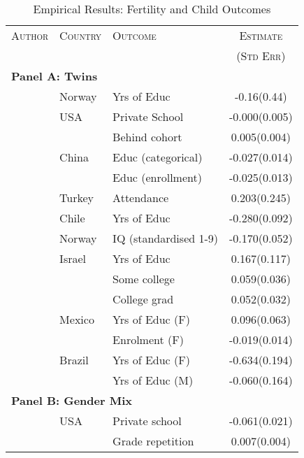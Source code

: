 \begin{table}
\caption{Empirical Results: Fertility and Child Outcomes}
\label{Ftab:childQQ}
\begin{tabular}{lllc} \toprule
\textsc{Author} & \textsc{Country} & \textsc{Outcome} & \textsc{Estimate} \\
                &                  &                  & \textsc{(Std Err)} \\ \midrule
\multicolumn{4}{l}{\textbf{Panel A: Twins}} \\
\citet{Blacketal2005}            &Norway   & Yrs of Educ         &-0.16(0.44) \\
\citet{Caceres2006}              &USA      &Private School       & -0.000(0.005)\\
                                 &         &Behind cohort        & 0.005(0.004)\\
\citet{Lietal2008}               &China    &Educ (categorical)   & -0.027(0.014)\\
                                 &         &Educ (enrollment)    & -0.025(0.013)\\
\citet{Dayiogluetal2009}         &Turkey   &Attendance           & 0.203(0.245)\\
\citet{Sanhueza2009}             &Chile    &Yrs of Educ          &-0.280(0.092)\\
\citet{Blacketal2010}            &Norway   &IQ (standardised 1-9)& -0.170(0.052)\\
\citet{Angristetal2010}          &Israel   &Yrs of Educ          & 0.167(0.117)\\
                                 &         &Some college         & 0.059(0.036)\\
                                 &         &College grad         & 0.052(0.032)\\
\citet{FitzsimonsMalde2010}      &Mexico   &Yrs of Educ (F)      & 0.096(0.063)\\
                                 &         &Enrolment (F)        &-0.019(0.014)\\
\citet{SouzaPonczek2012}         &Brazil   &Yrs of Educ (F)      & -0.634(0.194)\\
                                 &         &Yrs of Educ (M)      & -0.060(0.164)\\ \midrule
\multicolumn{4}{l}{\textbf{Panel B: Gender Mix}} \\
\citet{ConleyGlauber2006}        &USA      &Private school       &-0.061(0.021) \\
                                 &         &Grade repetition     &0.007(0.004)  \\

\end{tabular}
\end{table}
